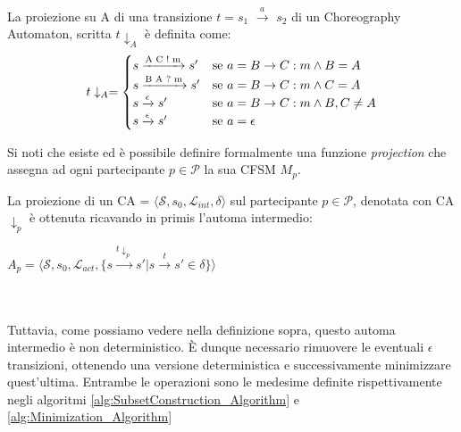 \begin{definition}[Proiezione]
    La proiezione su A di una transizione $t = s_1$ $\xrightarrow{a}$ $s_2$ di un Choreography Automaton, scritta $t\downarrow_{A}$ è definita come:
    \begin{equation*}
        t \downarrow_{A} =
        \begin{cases}
            s \xrightarrow{\text{A C ! m}} s' & $se $ a = B \rightarrow C : m \wedge B = A       \\
            s \xrightarrow{\text{B A ? m}} s' & $se $ a = B \rightarrow C : m \wedge C = A       \\
            s \xrightarrow{\epsilon} s'       & $se $ a = B \rightarrow C : m \wedge B, C \neq A \\
            s \xrightarrow{\epsilon} s'       & $se $ a = \epsilon
        \end{cases}
    \end{equation*}
\end{definition}
\begin{remark}
    Si noti che esiste ed è possibile definire formalmente una funzione \emph{projection} che assegna ad ogni partecipante $p \in \mathcal{P}$ la sua CFSM $M_p$.
\end{remark}
La proiezione di un CA = $\langle \mathcal{S}, s_0, \mathcal{L}_{int}, \delta \rangle$ sul partecipante $p \in \mathcal{P}$, denotata con CA$\downarrow_p$ è ottenuta ricavando in primis l'automa intermedio: \bigskip \\
\centerline{$A_p = \langle \mathcal{S}, s_0, \mathcal{L}_{act}, \{ s \xrightarrow{t\downarrow_{p}} s' | s \xrightarrow{t} s' \in \delta \} \rangle$}
\\ \\
Tuttavia, come possiamo vedere nella definizione sopra, questo automa intermedio è non deterministico. È dunque necessario rimuovere le eventuali $\epsilon$ transizioni, ottenendo una versione deterministica e successivamente minimizzare quest'ultima. Entrambe le operazioni sono le medesime definite rispettivamente negli algoritmi \ref{alg:SubsetConstruction_Algorithm} e \ref{alg:Minimization_Algorithm}


